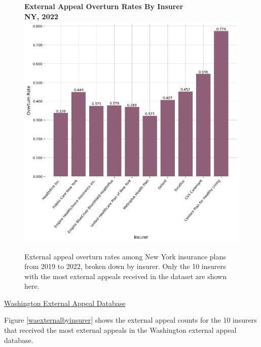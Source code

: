 \documentclass[12pt, a4paper,twoside,parskip=full]{report}
\theoremstyle{plain} %
\theoremstyle{definition} %
\theoremstyle{remark} %
\numberwithin{equation}{chapter}
\begin{document}
		
		\begin{figure}[h!]
			\centering
			\textbf{External Appeal Overturn Rates By Insurer}\\
			\textbf{NY, 2022}\\
			\includegraphics[width=.8\textwidth]{images/nys_external/overturn_rates_by_insurer.png}
			\caption{External appeal overturn rates among New York insurance plans from 2019 to 2022, broken down by insurer. Only the 10 insurers with the most external appeals received in the dataset are shown here.}
			\label{nyexternaloverturnsbyinsurer}
		\end{figure}
		\clearpage
	
	
		\underline{Washington External Appeal Database}

		Figure \ref{waexternalbyinsurer} shows the external appeal counts for the 10 insurers that received the most external appeals in the Washington external appeal database.
		
\end{document}
